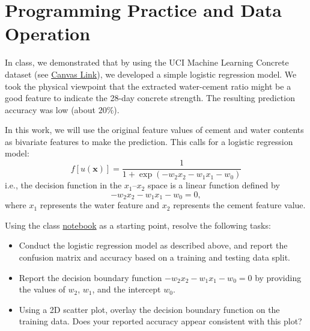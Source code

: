\documentclass[12pt]{article}
\begin{document}
\newpage

\section{Programming Practice and Data Operation}
In class, we demonstrated that by using the UCI Machine Learning Concrete dataset (see \href{https://umsystem.instructure.com/courses/280496/files/32742548?module_item_id=9797693}{Canvas Link}), we developed a simple logistic regression model. We took the physical viewpoint that the extracted water-cement ratio might be a good feature to indicate the 28-day concrete strength. The resulting prediction accuracy was low (about $20\%$).

In this work, we will use the original feature values of cement and water contents as bivariate features to make the prediction. This calls for a logistic regression model:
\[
f[u(\bm{x})] = \frac{1}{1+\exp(-w_2 x_2 -w_1 x_1 -w_0)}
\]
i.e., the decision function in the $x_1$--$x_2$ space is a linear function defined by 
\[
-w_2 x_2 -w_1 x_1 -w_0 = 0,
\]
where $x_1$ represents the water feature and $x_2$ represents the cement feature value.

Using the class \href{https://umsystem.instructure.com/courses/280496/files/32742547?module_item_id=9797692}{notebook} as a starting point, resolve the following tasks:
\begin{itemize}
    \item Conduct the logistic regression model as described above, and report the confusion matrix and accuracy based on a training and testing data split.
    \item Report the decision boundary function $-w_2 x_2 -w_1 x_1 -w_0 = 0$ by providing the values of $w_2$, $w_1$, and the intercept $w_0$.
    \item Using a 2D scatter plot, overlay the decision boundary function on the training data. Does your reported accuracy appear consistent with this plot?
\end{itemize}
\end{document}
